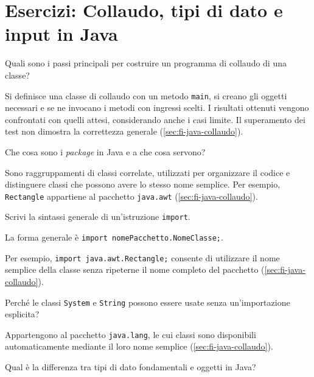 \chapter{Esercizi: Collaudo, tipi di dato e input in Java}
\label{chap:esercizi-collaudo-tipi-input-java}

\begin{exercise}
\label{ex:fi-esercizi-java-collaudo-passi}
Quali sono i passi principali per costruire un programma di collaudo di una
classe?
\end{exercise}

Si definisce una classe di collaudo con un metodo \texttt{main}, si creano gli
oggetti necessari e se ne invocano i metodi con ingressi scelti. I risultati
ottenuti vengono confrontati con quelli attesi, considerando anche i casi
limite. Il superamento dei test non dimostra la correttezza generale
(\cref{sec:fi-java-collaudo}).

\begin{exercise}
\label{ex:fi-esercizi-java-collaudo-package}
Che cosa sono i \emph{package} in Java e a che cosa servono?
\end{exercise}

Sono raggruppamenti di classi correlate, utilizzati per organizzare il codice
e distinguere classi che possono avere lo stesso nome semplice. Per esempio,
\texttt{Rectangle} appartiene al pacchetto \texttt{java.awt}
(\cref{sec:fi-java-collaudo}).

\begin{exercise}
\label{ex:fi-esercizi-java-collaudo-import}
Scrivi la sintassi generale di un'istruzione \texttt{import}.
\end{exercise}

La forma generale è \texttt{import nomePacchetto.NomeClasse;}.

Per esempio, \texttt{import java.awt.Rectangle;} consente di utilizzare
il nome semplice della classe senza ripeterne il nome completo del pacchetto
(\cref{sec:fi-java-collaudo}).

\begin{exercise}
\label{ex:fi-esercizi-java-collaudo-java-lang}
Perché le classi \texttt{System} e \texttt{String} possono essere usate senza
un'importazione esplicita?
\end{exercise}

Appartengono al pacchetto \texttt{java.lang}, le cui classi sono disponibili
automaticamente mediante il loro nome semplice
(\cref{sec:fi-java-collaudo}).

\begin{exercise}
\label{ex:fi-esercizi-java-collaudo-primitivi-oggetti}
Qual è la differenza tra tipi di dato fondamentali e oggetti in Java?
\end{exercise}

